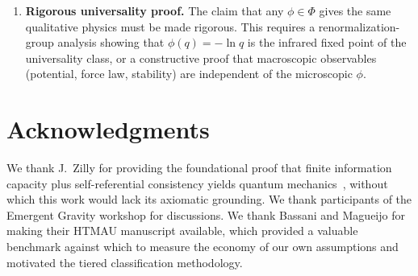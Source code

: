 \documentclass[aps,prd,twocolumn,showpacs,superscriptaddress,preprintnumbers]{revtex4-2}
\begin{document}
\begin{enumerate}
    \item \textbf{Rigorous universality proof.} The claim that any $\phi\in\Phi$ gives the same qualitative physics must be made rigorous. This requires a renormalization-group analysis showing that $\phi(q)=-\ln q$ is the infrared fixed point of the universality class, or a constructive proof that macroscopic observables (potential, force law, stability) are independent of the microscopic $\phi$.
\end{enumerate}

\section*{Acknowledgments}

We thank J.~Zilly for providing the foundational proof that finite information capacity plus self-referential consistency yields quantum mechanics~\cite{Zilly:2026}, without which this work would lack its axiomatic grounding.
We thank participants of the Emergent Gravity workshop for discussions.
We thank Bassani and Magueijo for making their HTMAU manuscript available, which provided a valuable benchmark against which to measure the economy of our own assumptions and motivated the tiered classification methodology.
\end{document}

